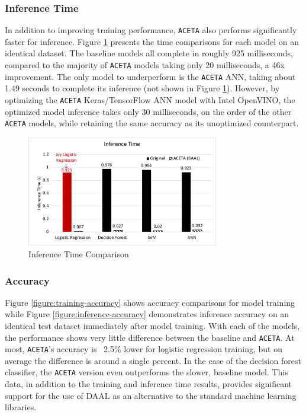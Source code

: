 \subsubsection{Inference Time}
In addition to improving training performance, \texttt{ACETA} also performs significantly faster for inference. Figure \ref{figure:inference-time} presents the time comparisons for each model on an identical dataset. The baseline models all complete in roughly 925 milliseconds, compared to the majority of \texttt{ACETA} models taking only 20 milliseconds, a 46x improvement. The only model to underperform is the \texttt{ACETA} ANN, taking about 1.49 seconds to complete its inference (not shown in Figure \ref{figure:inference-time}). However, by optimizing the \texttt{ACETA} Keras/TensorFlow ANN model with Intel OpenVINO, the optimized model inference takes only 30 milliseconds, on the order of the other \texttt{ACETA} models, while retaining the same accuracy as its unoptimized counterpart. 

\begin{figure}[h!]
	\centering
	\includegraphics[width=3.3in]{./fig/inference-time.pdf}
	\caption{Inference Time Comparison}
	\label{figure:inference-time}
\end{figure}

\subsubsection{Accuracy}
Figure \ref{figure:training-accuracy} shows accuracy comparisons for model training while Figure  \ref{figure:inference-accuracy} demonstrates inference accuracy on an identical test dataset immediately after model training. With each of the models, the performance shows very little difference between the baseline and \texttt{ACETA}. At most, \texttt{ACETA}'s accuracy is ~2.5\% lower for logistic regression training, but on average the difference is around a single percent. In the case of the decision forest classifier, the \texttt{ACETA} version even outperforms the slower, baseline model. This data, in addition to the training and inference time results, provides significant support for the use of DAAL as an alternative to the standard machine learning libraries.

